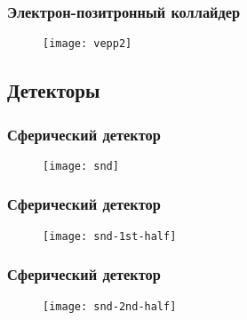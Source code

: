 \begin{frame}
    \frametitle{Электрон-позитронный коллайдер}
    \begin{figure}
        \begin{centering}
            \texttt{[image: vepp2]}
        \end{centering}
    \end{figure}
\end{frame}

\subsection{Детекторы}
\begin{frame}
    \frametitle{Сферический детектор}
    \begin{figure}
        \begin{centering}
            \texttt{[image: snd]}
        \end{centering}
    \end{figure}
\end{frame}
\begin{frame}
    \frametitle{Сферический детектор}
    \begin{figure}
        \begin{centering}
            \texttt{[image: snd-1st-half]}
        \end{centering}
    \end{figure}
\end{frame}
\begin{frame}
    \frametitle{Сферический детектор}
    \begin{figure}
        \begin{centering}
            \texttt{[image: snd-2nd-half]}
        \end{centering}
    \end{figure}
\end{frame}

